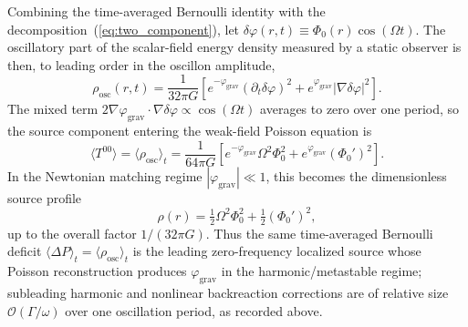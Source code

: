 \documentclass[aps,prd,onecolumn,superscriptaddress,nofootinbib,showpacs,12pt,notitlepage]{revtex4-2}
\renewcommand{\order}[1]{\mathcal{O}\!\left(#1\right)}
\begin{document}
Combining the time-averaged Bernoulli identity with the
decomposition~(\ref{eq:two_component}), let
$\delta\varphi(r,t) \equiv \Phi_0(r)\cos(\Omega t)$.  The
oscillatory part of the scalar-field energy density measured
by a static observer is then, to leading order in the
oscillon amplitude,
\begin{equation}
  \rho_{\mathrm{osc}}(r,t)
  = \frac{1}{32\pi G}\left[
      e^{-\varphi_{\mathrm{grav}}}(\partial_t\delta\varphi)^2
      + e^{\varphi_{\mathrm{grav}}}|\nabla\delta\varphi|^2
    \right].
\end{equation}
The mixed term
$2\nabla\varphi_{\mathrm{grav}}\!\cdot\!\nabla\delta\varphi
\propto \cos(\Omega t)$ averages to zero over one period, so
the source component entering the weak-field Poisson equation
is
\begin{equation}\label{eq:T00_osc_avg}
  \langle T^{00}\rangle
  = \langle \rho_{\mathrm{osc}}\rangle_t
  = \frac{1}{64\pi G}\left[
      e^{-\varphi_{\mathrm{grav}}}\Omega^2\Phi_0^2
      + e^{\varphi_{\mathrm{grav}}}(\Phi_0')^2
    \right].
\end{equation}
In the Newtonian matching regime $|\varphi_{\mathrm{grav}}| \ll 1$,
this becomes the dimensionless source profile
\begin{equation}\label{eq:rho_osc_numeric}
  \rho(r) = \tfrac{1}{2}\Omega^2\Phi_0^2
  + \tfrac{1}{2}(\Phi_0')^2,
\end{equation}
up to the overall factor $1/(32\pi G)$.  Thus the same
time-averaged Bernoulli deficit
$\langle\Delta P\rangle_t = \langle\rho_{\mathrm{osc}}\rangle_t$
is the leading zero-frequency localized source whose Poisson
reconstruction produces $\varphi_{\mathrm{grav}}$ in the
harmonic/metastable regime; subleading harmonic and nonlinear
backreaction corrections are of relative size
$\order{\Gamma/\omega}$ over one oscillation period, as recorded
above.
\end{document}
